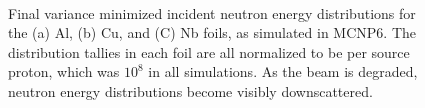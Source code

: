 \begin{figure}
    \centering    
    \\
    \caption{Final variance minimized incident neutron energy distributions for the (a) Al, (b) Cu, and (C) Nb foils, as simulated in MCNP6. The distribution tallies in each foil are all normalized to be per source proton, which was $10^8$ in all simulations. As the beam is degraded, neutron energy distributions become visibly downscattered.}
     \label{fig:fe_ntallies}
\end{figure}











